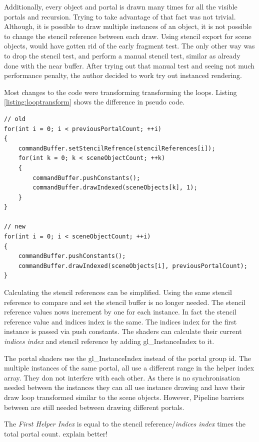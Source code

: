 Additionally, every object and portal is drawn many times for all the visible portals and recursion. Trying to take advantage of that fact was not trivial. Although, it is possible to draw multiple instances of an object, it is not possible to change the stencil reference between each draw. Using stencil export for scene objects, would have gotten rid of the early fragment test. The only other way was to drop the stencil test, and perform a manual stencil test, similar as already done with the near buffer. After trying out that manual test and seeing not much performance penalty, the author decided to work try out instanced rendering.

Most changes to the code were transforming transforming the loops. Listing \ref{listing:looptransform} shows the difference in pseudo code.

\begin{lstlisting}[caption={Pseudocode Loop Transformation}, label=listing:looptransform]
// old 
for(int i = 0; i < previousPortalCount; ++i)
{
	commandBuffer.setStencilRefrence(stencilReferences[i]);
	for(int k = 0; k < sceneObjectCount; ++k)
	{
		commandBuffer.pushConstants();
		commandBuffer.drawIndexed(sceneObjects[k], 1);
	}
}

// new
for(int i = 0; i < sceneObjectCount; ++i)
{
	commandBuffer.pushConstants();
	commandBuffer.drawIndexed(sceneObjects[i], previousPortalCount);
}
\end{lstlisting}

Calculating the stencil references can be simplified. Using the same stencil reference to compare and set the stencil buffer is no longer needed. The stencil reference values nows increment by one for each instance. In fact the stencil reference value and indices index is the same. The indices index for the first instance is passed via push constants. The shaders can calculate their current \textit{indices index} and stencil reference by adding gl\_InstanceIndex to it.

The portal shaders use the gl\_InstanceIndex instead of the portal group id. The multiple instances of the same portal, all use a different range in the helper index array. They don not interfere with each other. As there is no synchronisation needed between the instances they can all use instance drawing and have their draw loop transformed similar to the scene objects. However, Pipeline barriers between are still needed between drawing different portals.

The \textit{First Helper Index} is equal to the stencil reference/\textit{indices index} times the total portal count. {\huge explain better!} %

